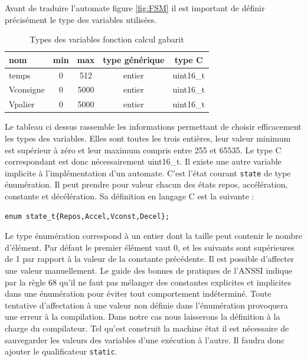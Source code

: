 \documentclass[a4paper]{article}
\begin{document}
	Avant de traduire l'automate figure \ref{fig:FSM} il est important de définir précisément le type des variables utilisées.
	
	\begin{table}[H]
		\centering
		\begin{tabular}{|l|c|c|c|c|}
			\hline
			nom	 		& min	& max & type générique & type C \\ \hline
			temps		& 0		& 512	& entier & uint16\_t \\ \hline
			Vconsigne	& 0		& 5000	& entier & uint16\_t \\ \hline
			Vpalier		& 0		& 5000	& entier & uint16\_t \\
			\hline
		\end{tabular}
		\caption{Types des variables fonction calcul gabarit}
	\end{table}
	Le tableau ci dessus rassemble les informations permettant de choisir efficacement les types des variables. Elles sont toutes les trois entières, leur valeur minimum est supérieur à zéro et leur maximum compris entre 255 et 65535. Le type C correspondant est donc nécessairement uint16\_t. Il existe une autre variable implicite à l'implémentation d'un automate. C'est l'état courant \texttt{state} de type énumération. Il peut prendre pour valeur chacun des états repos, accélération, constante et décélération. Sa définition en langage C est la suivante :
	\begin{lstlisting}[style=CStyle] 
	enum state_t{Repos,Accel,Vconst,Decel};\end{lstlisting}
	Le type énumération correspond à un entier dont la taille peut contenir le nombre d'élément. Par défaut le premier élément vaut 0, et les suivants sont supérieures de 1 par rapport à la	valeur de la constante précédente. Il est possible d'affecter une valeur manuellement. Le guide des bonnes de pratiques de l'ANSSI\cite{ANSSI2021} indique par la règle 68 qu'il ne faut pas mélanger des constantes explicites et implicites dans une énumération pour éviter tout comportement indéterminé. Toute tentative d'affectation à une valeur non définie dans l'énumération provoquera une erreur à la compilation. Dans notre cas nous laisserons la définition à la charge du compilateur. Tel qu'est construit la machine état il est nécessaire de sauvegarder les valeurs des variables d'une exécution à l'autre. Il faudra donc ajouter le qualificateur \texttt{static}.\newline \indent
\end{document}
